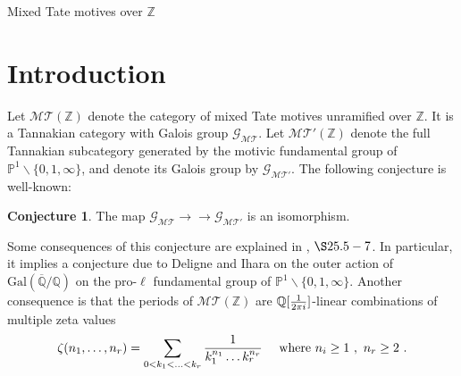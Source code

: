 \documentclass[10pt]{amsart}
\theoremstyle{definition}
\newtheorem{conj}{Conjecture}
\theoremstyle{remark}
\numberwithin{equation}{section}
\newcommand{\Z}{\mathbb Z}
\newcommand{\Pro}{\mathbb P}
\newcommand{\MT}{\mathcal{MT}}
\newcommand{\GMT}{\mathcal{G_{MT}}}
\newcommand{\GP}{\mathcal{G_{MT'}}}
\newcommand{\Q}{\mathbb Q}
\begin{document}
\author{Francis Brown}
\begin{title}[Mixed Tate motives over $\Z$]{Mixed Tate motives over $\Z$}\end{title}
\maketitle
\begin{abstract} We prove that the category of mixed Tate motives over $\Z$ is spanned by the motivic fundamental group of $\Pro^1$ minus three points.
We  prove a conjecture by M. Hoffman which states
 that every multiple zeta value is a $\Q$-linear combination of $\zeta(n_1,\ldots, n_r)$ where $n_i\in \{2,3\}$.
\end{abstract}
\section{Introduction}
Let $\MT(\Z)$ denote the category of mixed Tate motives unramified over $\Z$.
It is a Tannakian category with Galois group $\GMT$. Let
 $\MT'(\Z)$ denote the  full  Tannakian subcategory generated by   the  motivic fundamental group of $\Pro^1\backslash \{0,1,\infty\}$, and denote its
 Galois group by $\GP$.   The following conjecture is  well-known: 

\begin{conj} \label{conj1} The map $\GMT\rightarrow \!\!\!\!\!\rightarrow  \GP$ is an isomorphism.
\end{conj}
Some consequences of this  conjecture are   explained  in   \cite{Andre}, $\S25.5-7$.
In particular, it implies a conjecture due to Deligne and Ihara on the  outer action of $\mathrm{Gal}(\overline{\Q}/\Q)$ on the pro-$\ell$ fundamental group of $\Pro^1\backslash \{0,1,\infty\}$.  
Another  consequence is that the periods of $\MT(\Z)$ are $\Q[{1\over 2 \pi i }]$-linear combinations of 
multiple zeta values
\begin{equation}  \label{introzetadef}
\zeta(n_1,\ldots, n_r) = \sum_{0< k_1 < \ldots < k_r}  {1\over k_1^{n_1}\ldots k_r^{n_r}}  \quad \hbox{ where }  n_i\geq 1\ ,\  n_r\geq 2 \ .
\end{equation}
\end{document}
